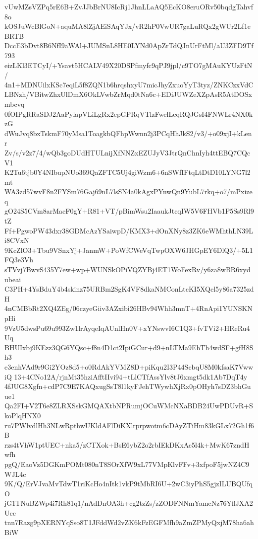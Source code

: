 vUwMZsVZPq5rE6B+ZvJJbBrNU8IcRj1JhnLLaAQ5EcKO8eruORv50bqdgTahvf8o
kOSJuWcBlGoN+aquMA8lZjAEiSAqYJx/vR2hP0VwUR7gaLuRQx2gWUr2Lf1eBRTB
DccE3bDvt8B6NfI9aWAl+JUMSnL8HE0LYNd0ApZrTdQJnUrFtMl/aU3ZFD9Tf793
eizLKl3ETCyI/+Ysavt5HCALV49X20DSPfmyfc9qPJ9jpl/c9TO7gMAuKYUzFtN/
4n1+MDNUilxKSc7eqiL5f8ZQN1b6hrqshxyU7micJhyZxuoYyT3tyz/ZNKCzxVdC
LBNzh/VBitwZhxUlDmX6OkLVwbZrMqd0tNa6c+EDiJUWZeXZpAsR5AtDOSxmbcvq
0fOIPgRRaSDJ2AaPylapVLiLgRx2epGPRqVTlzFwclLeqRQJGsI4FNWLr4NX0kzG
dWuJvq8bxTskmF70yMsa1ToagkbQFhpWwnn2j3PCqHhJkS2/v3/+o09xjI+kLenr
Zv/s/v2z7/4/wQb3goDUdHTULnijXfNNZxEZUJyV3JtrQnChnIyh4ttEBQ7CQcV1
K2Tu6tjb0Y4NIbupNUo369QaZFTC5Uj4giWzm6+6nSWfIFtqLtDtD10LYNG7l2mt
WA3zd57wvF8n2FYSm76Gaj69nL7lsSN4a0kAgxPYnwQn9YubL7rkq+o7/mPxizeq
gO24S5CVm8arMacF0gY+R81+VT/pBimWsu2IaaukJtcqIW5V6FHVb1P5Ss9Rl9tZ
Ff+PgwoPW43dxr38GDMcAzYSaiwpD/KMX3+dOnXNy8z3ZK6eWMhthLN39Li8CVxN
9KcZlO3+Tbu9VSnxYj+JanmW+PoWfCWeVqTwpOXW6JHGpEY6DlQ3/+5L1FQ3e3Vh
sTVvj7BwvS435Y7ew+wp+WUNSkOPiVQZYBj4ET1WoFexRv/y6za8wBR6xydubeai
C3PH+4YsBduY4b4skinz75URBm2SgK4VF8dkaNMConLtcKI5XQcl5y86a7325zdH
4nCMBbRt2XQ4ZEg/06czyeGiiv3AZxibi26HBv94Whh3mnT+4RnApi1YUNSKNpHi
9VzU5dwsPu69u993Zw1lrAyqeIqAUnlHn0V+xYNswvI6C1Q3+fvTVi2+HReRu4Uq
BHUIxbj9KEzz3QG6YQsc+f8n4D1ct2IpiGCur+d9+nLTMa9EhTh4wdSF+gfH8Sh3
e3enhVAd9r9Gi2YOz8d5+o0RdAkYVMZ8D+piKqu2I3P44ScbqU8M0kfsaK7VwwiQ
13+4CNo12A/rjnMt35hziAfftIIvi94+tLlCTfAssYlv8tJ6xmgt5dk1Ab7DqT4y
4fJUG8Xgfn+cdP7C9E7KAQxugSsT8l1kyFJehTWywhXjRx0pOHyh7sDZ3bhGuue1
Qa2FI+V2T6e8ZLRXSskGMQAXtbNPRumjOCuWMcNXaBDB24UwPDUvR+SkoPlqHNX0
ru7PWlvdlHh3NLwRpthwUKldAFlDiKXlrprpwotm6cDAyZTiHm83kGLx72Gh1f6B
rzs4tVhW1ptUEC+nka5/zCTXok+BsE6ybZ2o2rbIEkDKxAc5l4k+MwK67zndHwfh
pgQ/EaoVz5DGKmPOMt080nT8SOrXfW9xL77VMpKlvFFv+3xfpoF5jwNZ4C9WJL4c
9K/Q/ErVJvaMvTdwT1riKcHo4nItk1vkP9tMbRI6U+2wC3iyPhS5gjzILUBQUfqO
jG1TNuBZWp4i7Rh81q1/nAdDnOA3h+cg2tzZs/zZODFNNmYameNz76YflJXA2Ucc
tnn7Razg9pXERNYqSso8T1JFddWd2vZK6kFzEGFMfh9aZmZPMyQxjM78ha6ahBiW
